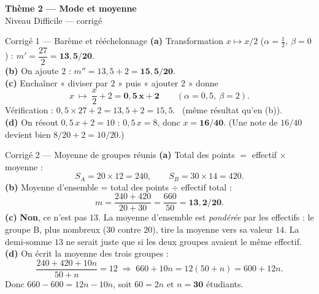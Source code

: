 \documentclass[11pt,a4paper]{article}
\newcommand{\bandeau}[2]{%
\begin{tcolorbox}[boxbase,colback=primary,colframe=primarydark,halign=center,
   before skip=2pt,after skip=12pt]
{\LARGE\bfseries\color{white} #1}\\[3pt]{\normalsize\color{white} #2}
\end{tcolorbox}}
\begin{document}
\bandeau{Thème 2 — Mode et moyenne}{Niveau Difficile — corrigé}

\begin{corbox}{Corrigé 1 — Barème et rééchelonnage}
\textbf{(a)} Transformation $x\mapsto x/2$ ($\alpha=\tfrac12,\ \beta=0$) :
$m'=\dfrac{27}{2}=\mathbf{13{,}5/20}$.\\[2pt]
\textbf{(b)} On ajoute $2$ : $m''=13{,}5+2=\mathbf{15{,}5/20}$.\\[2pt]
\textbf{(c)} Enchaîner « diviser par $2$ » puis « ajouter $2$ » donne
\[ x\ \longmapsto\ \frac{x}{2}+2=\mathbf{0{,}5\,x+2}\qquad(\alpha=0{,}5,\ \beta=2). \]
Vérification : $0{,}5\times27+2=13{,}5+2=15{,}5$. \checkmark\ (même résultat qu'en (b)).\\[2pt]
\textbf{(d)} On résout $0{,}5\,x+2=10$ : $0{,}5\,x=8$, donc $x=\mathbf{16/40}$.
(Une note de $16/40$ devient bien $8/20+2=10/20$.)
\end{corbox}

\begin{corbox}{Corrigé 2 — Moyenne de groupes réunis}
\textbf{(a)} Total des points $=$ effectif $\times$ moyenne :
\[ S_A=20\times12=240,\qquad S_B=30\times14=420. \]
\textbf{(b)} Moyenne d'ensemble = total des points $\div$ effectif total :
\[ m=\frac{240+420}{20+30}=\frac{660}{50}=\mathbf{13{,}2/20}. \]
\textbf{(c)} \textbf{Non}, ce n'est pas $13$. La moyenne d'ensemble est \emph{pondérée} par les
effectifs : le groupe B, plus nombreux ($30$ contre $20$), tire la moyenne vers sa valeur $14$.
La demi-somme $13$ ne serait juste que si les deux groupes avaient le même effectif.\\[2pt]
\textbf{(d)} On écrit la moyenne des trois groupes :
\[
\frac{240+420+10n}{50+n}=12 \;\Longrightarrow\; 660+10n=12(50+n)=600+12n.
\]
Donc $660-600=12n-10n$, soit $60=2n$ et $n=\mathbf{30}$ étudiants.
\end{corbox}
\end{document}
